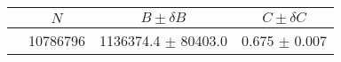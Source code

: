 \begin{tabular}{lccc}
\hline
    &   $N$   & $B \pm \delta B$  &  $C \pm \delta C$ \\
\hline
                               & 10786796   & 1136374.4  $\pm$ 80403.0 & 0.675      $\pm$ 0.007 \\
\hline
\end{tabular}
